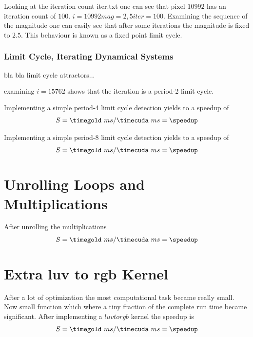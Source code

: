 Looking at the iteration count  iter.txt one can see that pixel $10992$ has an 
iteration count  of $100$. 
$ i = 10992 mag=2,5 iter=100$. Examining the sequence of the magnitude one can 
easily see that after some iterations the magnitude is fixed to $2.5$. This
behaviour is known as a fixed point limit cycle.

\subsubsection{Limit Cycle, Iterating Dynamical Systems} %
\label{ssub:limit_cycle_iterating_dynamical_systems}
bla bla  limit cycle attractors...


examining $i = 15762$ shows that the iteration is a period-2 limit cycle.

Implementing a simple period-4 limit cycle detection yields to a speedup of
\fpDiv{\speedup}{\timegold}{\timecuda}
\begin{equation*}\label{eq:speedup0}
	S = \timegold\ ms/\timecuda\ ms = \speedup
\end{equation*}

Implementing a simple period-8 limit cycle detection yields to a speedup of
\fpDiv{\speedup}{\timegold}{\timecuda}
\begin{equation*}\label{eq:speedup0}
	S = \timegold\ ms/\timecuda\ ms = \speedup
\end{equation*}


\section{Unrolling Loops and Multiplications} %
\label{sec:unrolling_loops_and_multiplications}

After unrolling the multiplications 
\fpDiv{\speedup}{\timegold}{\timecuda}
\begin{equation*}\label{eq:speedup0}
	S = \timegold\ ms/\timecuda\ ms = \speedup
\end{equation*}

\section{Extra luv to rgb Kernel}

After a lot of optimization the most computational task became really small. Now
small function which where a tiny fraction of the complete run time became 
significant. 
After implementing a $luvtorgb$ kernel the speedup is 
\fpDiv{\speedup}{\timegold}{\timecuda}
\begin{equation*}\label{eq:speedup0}
	S = \timegold\ ms/\timecuda\ ms = \speedup
\end{equation*}



